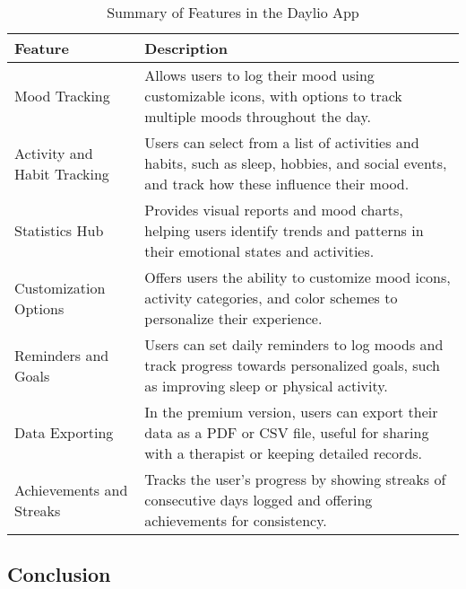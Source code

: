 \FloatBarrier
\begin{table}[ht]
\centering
\begin{tabular}{|p{4cm}|p{10cm}|}
\hline
\textbf{Feature} & \textbf{Description} \\ \hline
Mood Tracking & Allows users to log their mood using customizable icons, with options to track multiple moods throughout the day. \\ \hline
Activity and Habit Tracking & Users can select from a list of activities and habits, such as sleep, hobbies, and social events, and track how these influence their mood. \\ \hline
Statistics Hub & Provides visual reports and mood charts, helping users identify trends and patterns in their emotional states and activities. \\ \hline
Customization Options & Offers users the ability to customize mood icons, activity categories, and color schemes to personalize their experience. \\ \hline
Reminders and Goals & Users can set daily reminders to log moods and track progress towards personalized goals, such as improving sleep or physical activity. \\ \hline
Data Exporting & In the premium version, users can export their data as a PDF or CSV file, useful for sharing with a therapist or keeping detailed records. \\ \hline
Achievements and Streaks & Tracks the user's progress by showing streaks of consecutive days logged and offering achievements for consistency. \\ \hline
\end{tabular}
\caption{Summary of Features in the Daylio App}
\label{tab:daylio_features}
\end{table}
\FloatBarrier

\subsection{Conclusion}

